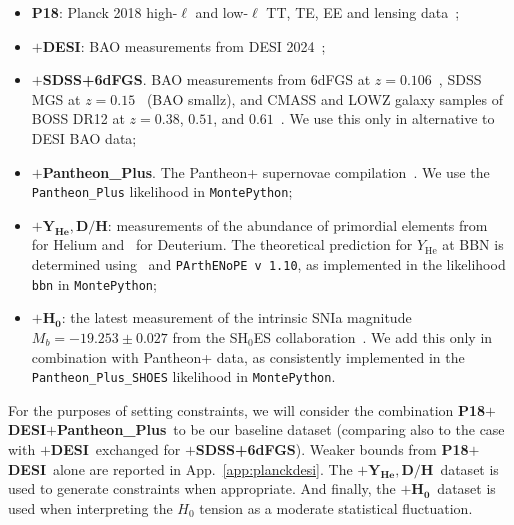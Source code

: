 \documentclass[aps,prd,twocolumn,notitlepage,
superscriptaddress,
nofootinbib,floatfix]{revtex4-2}
\newcommand{\planck}{\textbf{P18}}
\newcommand{\desi}{$\mathbf{+}$\textbf{DESI}}
\newcommand{\boss}{$\mathbf{+}$\textbf{SDSS+6dFGS}}
\newcommand{\pantheon}{$\mathbf{+}${\bf Pantheon\_Plus}}
\newcommand{\bbnlike}{$\mathbf{+ Y_\text{He}, D/H}$}
\newcommand{\shoes}{$\mathbf{+ H_0}$}
\begin{document}
\begin{itemize}
\item{\planck: Planck 2018 high-$\ell$ and low-$\ell$ TT, TE, EE and lensing data~\cite{Planck:2019nip}};

\item{\desi: BAO measurements from DESI 2024~\cite{DESI:2024mwx}; }

\item{\boss. BAO measurements from 6dFGS at $z = 0.106$~\cite{Beutler:2011hx}, SDSS MGS at $z = 0.15$~\cite{Ross:2014qpa} (BAO smallz), and CMASS and LOWZ galaxy samples of BOSS DR12 at $z = 0.38$, $0.51$, and $0.61$~\cite{BOSS:2016wmc}. We use this only in alternative to DESI BAO data;}

\item{\pantheon. The Pantheon+ supernovae compilation~\cite{Scolnic:2021amr}. We use the {\tt Pantheon\_Plus} likelihood in {\tt MontePython};}

\item{\bbnlike: measurements of the abundance of primordial elements from~\cite{Aver:2015iza} for Helium and~\cite{Cooke:2017cwo} for Deuterium. The theoretical prediction for $Y_\text{He}$ at BBN is determined using~\cite{Marcucci:2015yla} and {\tt PArthENoPE v 1.10}, as implemented in the likelihood {\tt bbn} in {\tt MontePython};}


\item{\shoes: the latest measurement of the intrinsic SNIa magnitude $M_b=-19.253\pm0.027$ from the SH$_{0}$ES collaboration~\cite{Riess:2021jrx}. We add this only in combination with Pantheon+ data, as consistently implemented in the {\tt Pantheon\_Plus\_SHOES} likelihood in {\tt MontePython}.}

\end{itemize}


For the purposes of setting constraints, we will consider the combination \planck\desi\pantheon\, to be our baseline dataset (comparing also to the case with \desi\, exchanged for \boss). Weaker bounds from \planck\desi\, alone are reported in App.~\ref{app:planckdesi}. The \bbnlike\, dataset is used to generate constraints when appropriate. And finally, the \shoes\, dataset is used when interpreting the $H_0$ tension as a moderate statistical fluctuation.







\end{document}
